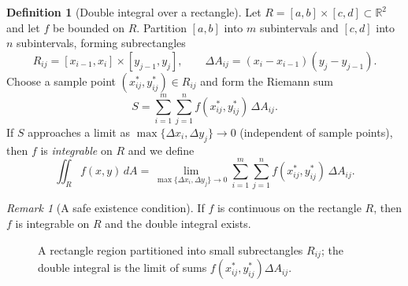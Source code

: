 \documentclass[12pt]{article}
\numberwithin{equation}{section}
\newcommand{\RR}{\mathbb{R}}
\theoremstyle{plain}
\theoremstyle{definition}
\newtheorem{definition}[theorem]{Definition}
\theoremstyle{remark}
\newtheorem{remark}[theorem]{Remark}
\begin{document}
\begin{definition}[Double integral over a rectangle]\label{def:double-rect}
Let $R=[a,b]\times[c,d]\subset\RR^2$ and let $f$ be bounded on $R$.
Partition $[a,b]$ into $m$ subintervals and $[c,d]$ into $n$ subintervals, forming subrectangles
\[
R_{ij}=[x_{i-1},x_i]\times[y_{j-1},y_j],\qquad
\Delta A_{ij}=(x_i-x_{i-1})(y_j-y_{j-1}).
\]
Choose a sample point $(x_{ij}^*,y_{ij}^*)\in R_{ij}$ and form the Riemann sum
\[
S=\sum_{i=1}^{m}\sum_{j=1}^{n} f(x_{ij}^*,y_{ij}^*)\,\Delta A_{ij}.
\]
If $S$ approaches a limit as $\max\{\Delta x_i,\Delta y_j\}\to 0$ (independent of sample points), then $f$ is \emph{integrable} on $R$ and we define
\[
\iint_R f(x,y)\,dA=\lim_{\max\{\Delta x_i,\Delta y_j\}\to 0}\sum_{i=1}^{m}\sum_{j=1}^{n} f(x_{ij}^*,y_{ij}^*)\,\Delta A_{ij}.
\]
\end{definition}

\begin{remark}[A safe existence condition]
If $f$ is continuous on the rectangle $R$, then $f$ is integrable on $R$ and the double integral exists.
\end{remark}

\begin{figure}[H]
\centering
{}
\caption{A rectangle region partitioned into small subrectangles $R_{ij}$; the double integral is the limit of sums $f(x^*_{ij},y^*_{ij})\Delta A_{ij}$.}
\label{fig:double-riemann}
\end{figure}
\end{document}
